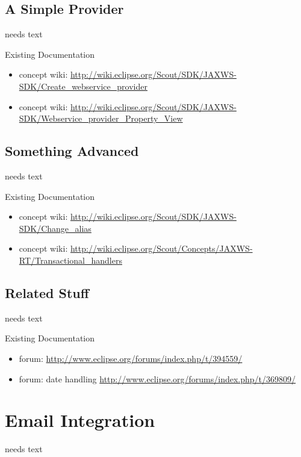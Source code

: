 \documentclass[a4paper,10pt,twoside]{book}
\begin{document}
\section{A Simple Provider}
needs text

\noindent Existing Documentation
\begin{itemize}
  \item concept wiki: \url{http://wiki.eclipse.org/Scout/SDK/JAXWS-SDK/Create_webservice_provider}
  \item concept wiki: \url{http://wiki.eclipse.org/Scout/SDK/JAXWS-SDK/Webservice_provider_Property_View}
\end{itemize}

\section{Something Advanced}
needs text

\noindent Existing Documentation
\begin{itemize}
  \item concept wiki: \url{http://wiki.eclipse.org/Scout/SDK/JAXWS-SDK/Change_alias}
  \item concept wiki: \url{http://wiki.eclipse.org/Scout/Concepts/JAXWS-RT/Transactional_handlers}
\end{itemize}

\section{Related Stuff}
needs text

\noindent Existing Documentation
\begin{itemize}
  \item forum: \url{http://www.eclipse.org/forums/index.php/t/394559/}
  \item forum: date handling \url{http://www.eclipse.org/forums/index.php/t/369809/}
\end{itemize}

\chapter{Email Integration}
needs text
\end{document}
